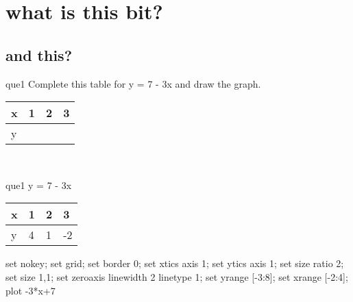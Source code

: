 \documentclass[13.5pt, varwidth=true]{beamer}
\begin{document}
\date{}

\section[Graphs]{what is this bit?}
\subsection[title]{and this?}

\begin{frame}[shrink=19,fragile]
	\begin{beamercolorbox}[rounded=true, left, shadow=true,wd=14.8cm]{que1}
		 Complete this table for y = 7 - 3x and draw the graph. \\[0.3cm] \renewcommand{\arraystretch}{1.2}\begin{tabular}{|C|C|C|C|} \hline x & 1 & 2 & 3 \\ \hline y & & & \\ \hline \end{tabular}\\[0.3cm]
	\end{beamercolorbox}
\end{frame}
\begin{frame}[shrink=19,fragile]
	\begin{beamercolorbox}[rounded=true, left, shadow=true,wd=14.8cm]{que1}
		y = 7 - 3x\renewcommand{\arraystretch}{1.2}\begin{tabular}{|C|C|C|C|} \hline x & 1 & 2 & 3 \\ \hline y & 4 & 1 & -2\\ \hline \end{tabular}\begin{gnuplot}[terminal=pdf] set nokey; set grid; set border 0; set xtics axis 1; set ytics axis 1; set size ratio 2; set size 1,1; set zeroaxis linewidth 2 linetype 1; set yrange [-3:8]; set xrange [-2:4]; plot -3*x+7 \end{gnuplot}
	\end{beamercolorbox}
\end{frame}
\end{document}
